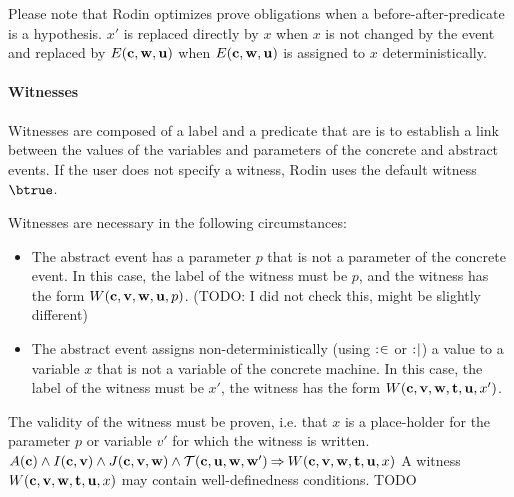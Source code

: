 Please note that Rodin optimizes prove obligations when a before-after-predicate is a hypothesis.
$x'$ is replaced directly by $x$ when $x$ is not changed by the event and replaced by $E(\mathbf{c},\mathbf{w},\mathbf{u})$
 when $E(\mathbf{c},\mathbf{w},\mathbf{u})$ is assigned to $x$ deterministically.

\paragraph{Witnesses}
\label{witness}

Witnesses are composed of a label and a predicate that are is to establish a link between the values 
  of the variables and parameters of the concrete and abstract events.
If the user does not specify a witness, Rodin uses the default witness $\btrue$.

Witnesses are necessary in the following circumstances:
\begin{itemize}
\item The abstract event has a parameter $p$ that is not a parameter of the concrete
  event.
  In this case, the label of the witness must be $p$, and the witness has the form $W(\mathbf{c},{\mathbf{v},\mathbf{w}},\mathbf{u},p)$.
  (TODO: I did not check this, might be slightly different)
\item The abstract event assigns non-deterministically (using $\mathrel{:\mkern1mu\in}$ or $\mathrel{:\mkern1mu\mid}$) 
  a value to a variable $x$ that is not a variable of the concrete machine.
  In this case, the label of the witness must be $x'$, the witness has the form $W(\mathbf{c},{\mathbf{v},\mathbf{w}},{\mathbf{t},\mathbf{u}},x')$.
\end{itemize}

The validity of the witness must be proven, i.e. that $x$ is a place-holder for the parameter $p$ or variable $v'$ for which the witness is written.
%
  {$A(\mathbf{c}) \land I(\mathbf{c},\mathbf{v}) \land J(\mathbf{c},{\mathbf{v},\mathbf{w}}) \land
    \mathcal{T}(\mathbf{c},\mathbf{u},\mathbf{w},\mathbf{w}') \mathbin\Rightarrow
    W(\mathbf{c},{\mathbf{v},\mathbf{w}},{\mathbf{t},\mathbf{u}},x)$}
A witness $W(\mathbf{c},{\mathbf{v},\mathbf{w}},{\mathbf{t},\mathbf{u}},x)$ may contain well-definedness conditions.
%
  {TODO}

